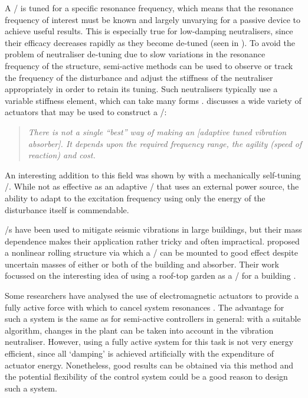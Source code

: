 \documentclass[11pt,a4paper]{memoir}
\begin{document}
A \vibneut/ is tuned for a specific resonance frequency, which means that the resonance frequency of interest must be known and largely unvarying for a passive device to achieve useful results.
This is especially true for low-damping neutralisers, since their efficacy decreases rapidly as they become de-tuned (seen in ).
To avoid the problem of neutraliser de-tuning due to slow variations in the resonance frequency of the structure, semi-active methods can be used to observe or track the frequency of the disturbance and adjust the stiffness of the neutraliser appropriately in order to retain its tuning.
Such neutralisers typically use a variable stiffness element, which can take many forms \cite{ting-kong1999,kidner2002,holdhusen2007}.
\textcite{brennan2006} discusses a wide variety of actuators that may be used to construct a \vibneut/:
\begin{quote}\itshape
There is not a single ``best'' way of making an \textup[adaptive tuned vibration absorber\textup].
It depends upon the required frequency range, the agility (speed of reaction) and cost.
\end{quote}
An interesting addition to this field was shown by
\textcite{ivers2008} with a mechanically self-tuning \vibneut/.
While not as effective as an adaptive \vibneut/ that uses an external power source, the ability to adapt to the excitation frequency using only the energy of the disturbance itself is commendable.

\Vibneut/s have been used to mitigate seismic vibrations in large buildings, but their mass dependence makes their application rather tricky and often impractical.
\textcite{matta2008} proposed a nonlinear rolling structure via which a \vibneut/ can be mounted to good effect despite uncertain masses of either or both of the building and absorber.
Their work focussed on the interesting idea of using a roof-top garden as a \vibneut/ for a building \cite{matta2008a}.

Some researchers have analysed the use of electromagnetic actuators to provide a fully active force with which to cancel system resonances \cite{chen2005a,wu2007,kim2008-iecst}.
The advantage for such a system is the same as for semi-active controllers in general: with a suitable algorithm, changes in the plant can be taken into account in the vibration neutraliser.
However, using a fully active system for this task is not very energy efficient, since all `damping' is achieved artificially with the expenditure of actuator energy.
Nonetheless, good results can be obtained via this method and the potential flexibility of the control system could be a good reason to design such a system.
\end{document}
